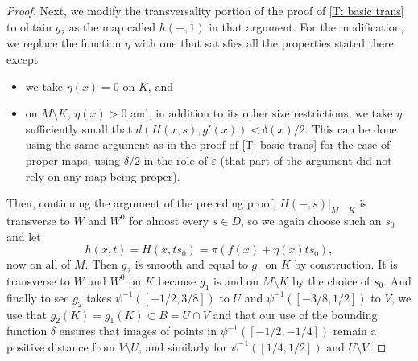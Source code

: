 \documentclass[12pt]{article}
\theoremstyle{plain}
\theoremstyle{definition}
\theoremstyle{remark}
\begin{document}
\begin{proof}
	Next, we modify the transversality portion of the proof of \cref{T: basic trans} to obtain $g_2$ as the map called $h(-,1)$ in that argument.
	For the modification, we replace the function $\eta$ with one that satisfies all the properties stated there except
	\begin{itemize}
		\item we take $\eta(x)=0$ on $K$, and
		\item on $M \setminus K$, $\eta(x) > 0$ and, in addition to its other size restrictions, we take $\eta$ sufficiently small that $d(H(x,s),g'(x)) < \delta(x)/2$.
		This can be done using the same argument as in the proof of \cref{T: basic trans} for the case of proper maps, using $\delta/2$ in the role of $\varepsilon$ (that part of the argument did not rely on any map being proper).
	\end{itemize}
	Then, continuing the argument of the preceding proof, $H(-,s)|_{M-K}$ is transverse to $W$ and $W^0$ for almost every $s \in D$, so we again choose such an $s_0$ and let $$h(x,t) = H(x, ts_0) = \pi(f(x) + \eta(x)ts_0),$$ now on all of $M$.
	Then $g_2$ is smooth and equal to $g_1$ on $K$ by construction.
	It is transverse to $W$ and $W^0$ on $K$ because $g_1$ is and on $M \setminus K$ by the choice of $s_0$.
	And finally to see $g_2$ takes $\psi^{-1}([-1/2,3/8])$ to $U$ and $\psi^{-1}([-3/8,1/2])$ to $V$, we use that $g_2(K) = g_1(K) \subset B = U \cap V$ and that our use of the bounding function $\delta$ ensures that images of points in $\psi^{-1}([-1/2,-1/4])$ remain a positive distance from $V \setminus U$, and similarly for $\psi^{-1}([1/4,1/2])$ and $U \setminus V$.
\end{proof}




\end{document}
